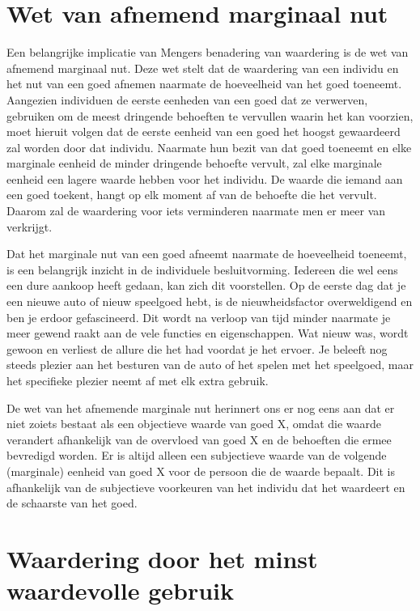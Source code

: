 \section{Wet van afnemend marginaal nut}

Een belangrijke implicatie van Mengers benadering van waardering is de wet van afnemend marginaal nut. Deze wet stelt dat de waardering van een individu en het nut van een goed afnemen naarmate de hoeveelheid van het goed toeneemt. Aangezien individuen de eerste eenheden van een goed dat ze verwerven, gebruiken om de meest dringende behoeften te vervullen waarin het kan voorzien, moet hieruit volgen dat de eerste eenheid van een goed het hoogst gewaardeerd zal worden door dat individu. Naarmate hun bezit van dat goed toeneemt en elke marginale eenheid de minder dringende behoefte vervult, zal elke marginale eenheid een lagere waarde hebben voor het individu. De waarde die iemand aan een goed toekent, hangt op elk moment af van de behoefte die het vervult. Daarom zal de waardering voor iets verminderen naarmate men er meer van verkrijgt.

Dat het marginale nut van een goed afneemt naarmate de hoeveelheid toeneemt, is een belangrijk inzicht in de individuele besluitvorming. Iedereen die wel eens een dure aankoop heeft gedaan, kan zich dit voorstellen. Op de eerste dag dat je een nieuwe auto of nieuw speelgoed hebt, is de nieuwheidsfactor overweldigend en ben je erdoor gefascineerd. Dit wordt na verloop van tijd minder naarmate je meer gewend raakt aan de vele functies en eigenschappen. Wat nieuw was, wordt gewoon en verliest de allure die het had voordat je het ervoer. Je beleeft nog steeds plezier aan het besturen van de auto of het spelen met het speelgoed, maar het specifieke plezier neemt af met elk extra gebruik.

De wet van het afnemende marginale nut herinnert ons er nog eens aan dat er niet zoiets bestaat als een objectieve waarde van goed X, omdat die waarde verandert afhankelijk van de overvloed van goed X en de behoeften die ermee bevredigd worden. Er is altijd alleen een subjectieve waarde van de volgende (marginale) eenheid van goed X voor de persoon die de waarde bepaalt. Dit is afhankelijk van de subjectieve voorkeuren van het individu dat het waardeert en de schaarste van het goed.

\section{Waardering door het minst waardevolle gebruik}

